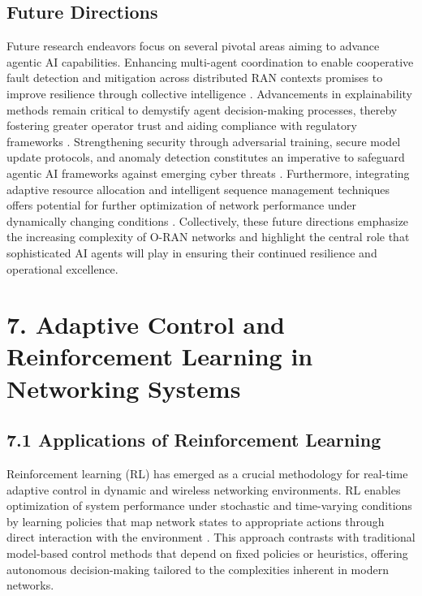 \documentclass[11pt]{article}
\begin{document}
\begin{itemize}
\subsection{Future Directions}

Future research endeavors focus on several pivotal areas aiming to advance agentic AI capabilities. Enhancing multi-agent coordination to enable cooperative fault detection and mitigation across distributed RAN contexts promises to improve resilience through collective intelligence \cite{ref21}. Advancements in explainability methods remain critical to demystify agent decision-making processes, thereby fostering greater operator trust and aiding compliance with regulatory frameworks \cite{ref48}. Strengthening security through adversarial training, secure model update protocols, and anomaly detection constitutes an imperative to safeguard agentic AI frameworks against emerging cyber threats \cite{ref50}. Furthermore, integrating adaptive resource allocation and intelligent sequence management techniques offers potential for further optimization of network performance under dynamically changing conditions \cite{ref21}. Collectively, these future directions emphasize the increasing complexity of O-RAN networks and highlight the central role that sophisticated AI agents will play in ensuring their continued resilience and operational excellence.


\section{7. Adaptive Control and Reinforcement Learning in Networking Systems}

\subsection{7.1 Applications of Reinforcement Learning}

Reinforcement learning (RL) has emerged as a crucial methodology for real-time adaptive control in dynamic and wireless networking environments. RL enables optimization of system performance under stochastic and time-varying conditions by learning policies that map network states to appropriate actions through direct interaction with the environment \cite{ref2, ref5, ref7, ref12, ref31, ref32, ref33, ref34, ref35, ref50}. This approach contrasts with traditional model-based control methods that depend on fixed policies or heuristics, offering autonomous decision-making tailored to the complexities inherent in modern networks.


\end{itemize}
\end{document}
